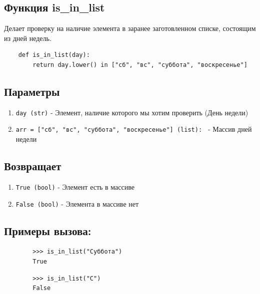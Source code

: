 \documentclass{article}
\begin{document}

    \hrulefill

    \subsection{Функция is\_in\_list}
    
    Делает проверку на наличие элемента в заранее заготовленном списке, состоящим из дней недель.
    
    \begin{verbatim}
    def is_in_list(day):
        return day.lower() in ["сб", "вс", "суббота", "воскресенье"]
    \end{verbatim}
    
    \subsection*{Параметры}
        \begin{enumerate}
            \item \texttt{day (str)} - Элемент, наличие которого мы хотим проверить (День недели)
            \item \texttt{arr = ["сб", "вс", "суббота", "воскресенье"] (list): } - Массив дней недели
        \end{enumerate}
        
        \subsection*{Возвращает}
        \begin{enumerate}
            \item \texttt{True (bool)} -  Элемент есть в массиве
            \item \texttt{False (bool)} - Элемента в массиве нет        \end{enumerate}
    
    
    \subsection*{Примеры вызова:}
        \begin{verbatim}
        >>> is_in_list("Суббота")
        True
        \end{verbatim}

        \begin{verbatim}
        >>> is_in_list("С")
        False
        \end{verbatim}
\end{document}
